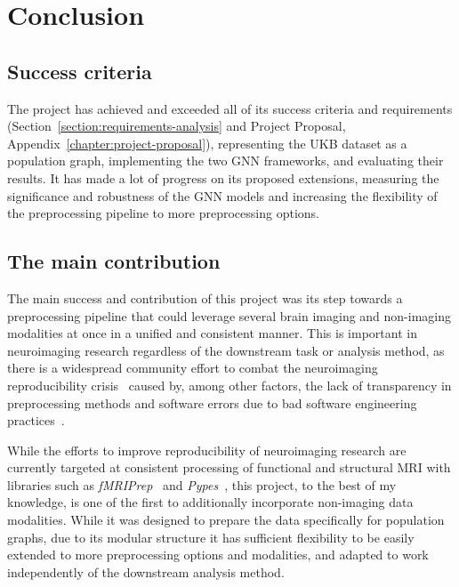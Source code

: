 \chapter{Conclusion}



\section{Success criteria}
The project has achieved and exceeded all of its success criteria and requirements (Section~\ref{section:requirements-analysis} and Project Proposal, Appendix~\ref{chapter:project-proposal}), representing the UKB dataset as a population graph, implementing the two GNN frameworks, and evaluating their results. It has made a lot of progress on its proposed extensions, measuring the significance and robustness of the GNN models and increasing the flexibility of the preprocessing pipeline to more preprocessing options.

\section{The main contribution}
The main success and contribution of this project was its step towards a preprocessing pipeline that could leverage several brain imaging and non-imaging modalities at once in a unified and consistent manner. This is important in neuroimaging research regardless of the downstream task or analysis method, as there is a widespread community effort to combat the neuroimaging reproducibility crisis~\cite{gorgolewski2016practical} caused by, among other factors, the lack of transparency in preprocessing methods and software errors due to bad software engineering practices~\cite{poldrack2017scanning}.

While the efforts to improve reproducibility of neuroimaging research are currently targeted at consistent processing of functional and structural MRI with libraries such as \textit{fMRIPrep}~\cite{esteban2019fmriprep} and \textit{Pypes}~\cite{savio2017pypes}, this project, to the best of my knowledge, is one of the first to additionally incorporate non-imaging data modalities. While it was designed to prepare the data specifically for population graphs, due to its modular structure it has sufficient flexibility to be easily extended to more preprocessing options and modalities, and adapted to work independently of the downstream analysis method.

